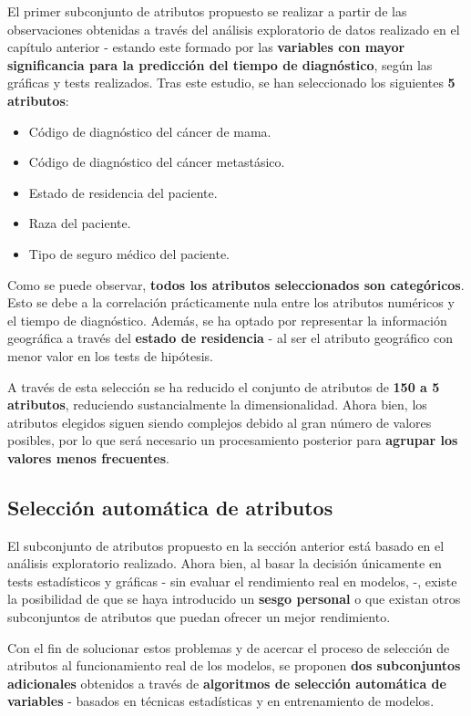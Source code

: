 El primer subconjunto de atributos propuesto se realizar a partir de las observaciones obtenidas a través del análisis exploratorio de datos realizado en el capítulo anterior - estando este formado por las \textbf{variables con mayor significancia para la predicción del tiempo de diagnóstico}, según las gráficas y tests realizados. Tras este estudio, se han seleccionado los siguientes \textbf{5 atributos}:

\begin{itemize}[parsep=1pt, itemsep=1pt, topsep=4pt]
	\item Código de diagnóstico del cáncer de mama.
	\item Código de diagnóstico del cáncer metastásico.
	\item Estado de residencia del paciente.
	\item Raza del paciente.
	\item Tipo de seguro médico del paciente.
\end{itemize}

Como se puede observar, \textbf{todos los atributos seleccionados son categóricos}. Esto se debe a la correlación prácticamente nula entre los atributos numéricos y el tiempo de diagnóstico. Además, se ha optado por representar la información geográfica a través del \textbf{estado de residencia} - al ser el atributo geográfico con menor valor en los tests de hipótesis.

A través de esta selección se ha reducido el conjunto de atributos de \textbf{150 a 5 atributos}, reduciendo sustancialmente la dimensionalidad. Ahora bien, los atributos elegidos siguen siendo complejos debido al gran número de valores posibles, por lo que será necesario un procesamiento posterior para \textbf{agrupar los valores menos frecuentes}.

\subsection{Selección automática de atributos}

El subconjunto de atributos propuesto en la sección anterior está basado en el análisis exploratorio realizado. Ahora bien, al basar la decisión únicamente en tests estadísticos y gráficas - sin evaluar el rendimiento real en modelos, -, existe la posibilidad de que se haya introducido un \textbf{sesgo personal} o que existan otros subconjuntos de atributos que puedan ofrecer un mejor rendimiento.

Con el fin de solucionar estos problemas y de acercar el proceso de selección de atributos al funcionamiento real de los modelos, se proponen \textbf{dos subconjuntos adicionales} obtenidos a través de \textbf{algoritmos de selección automática de variables} \cite{featureselection} - basados en técnicas estadísticas y en entrenamiento de modelos.

